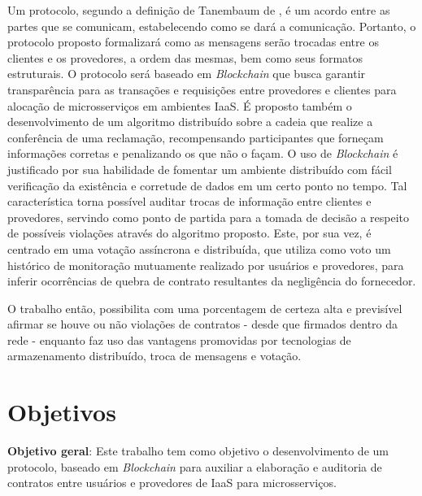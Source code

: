 Um protocolo, segundo a definição de Tanembaum de \citeyear{nuvem_sla:tanenbaum}, é um acordo entre as partes que se comunicam, estabelecendo como se dará a comunicação. Portanto, o protocolo proposto formalizará como as mensagens serão trocadas entre os clientes e os provedores, a ordem das mesmas, bem como seus formatos estruturais.
%
%
O protocolo será baseado em \textit{Blockchain} que busca garantir transparência para as transações e requisições entre provedores e clientes para alocação de microsserviços em ambientes \ac{IaaS}. É proposto também o desenvolvimento de um algoritmo distribuído sobre a cadeia que realize a conferência de uma reclamação, recompensando participantes que forneçam informações corretas e penalizando os que não o façam.
%
O uso de \textit{Blockchain} é justificado por sua habilidade de fomentar um ambiente distribuído com fácil verificação da existência e corretude de dados em um certo ponto no tempo. Tal característica torna possível auditar trocas de informação entre clientes e provedores, servindo como ponto de partida para a tomada de decisão a respeito de possíveis violações através do algoritmo proposto. Este, por sua vez, é centrado em uma votação assíncrona e distribuída, que utiliza como voto um histórico de monitoração mutuamente realizado por usuários e provedores, para inferir ocorrências de quebra de contrato resultantes da negligência do fornecedor.

%
O trabalho então, possibilita com uma porcentagem de certeza alta e previsível afirmar se houve ou não violações de contratos - desde que firmados dentro da rede - enquanto faz uso das vantagens promovidas por tecnologias de armazenamento distribuído, troca de mensagens e votação.

\clearpage


\section{Objetivos}

\textbf{Objetivo geral}: Este trabalho tem como objetivo o desenvolvimento de um protocolo, baseado em
\textit{Blockchain} para auxiliar a elaboração e auditoria de contratos entre usuários e provedores de IaaS para microsserviços.

